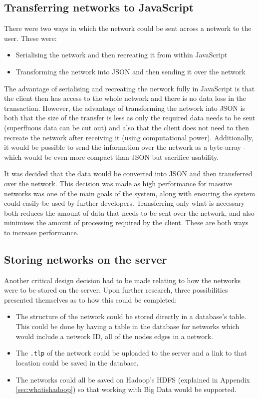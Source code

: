 \documentclass[../dissertation.tex]{subfiles}
\begin{document}
\subsection{Transferring networks to JavaScript}

There were two ways in which the network could be sent across a network to the user. These were:

\begin{itemize}
    \item Serialising the network and then recreating it from within JavaScript
    \item Transforming the network into JSON and then sending it over the network
\end{itemize}

The advantage of serialising and recreating the network fully in JavaScript is that the client then has access to the whole network and there is no data loss in the transaction. However, the advantage of transforming the network into JSON is both that the size of the transfer is less as only the required data needs to be sent (superfluous data can be cut out) and also that the client does not need to then recreate the network after receiving it (using computational power). Additionally, it would be possible to send the information over the network as a byte-array - which would be even more compact than JSON but sacrifice usability. 

It was decided that the data would be converted into JSON and then transferred over the network. This decision was made as high performance for massive networks was one of the main goals of the system, along with ensuring the system could easily be used by further developers. Transferring only what is necessary both reduces the amount of data that needs to be sent over the network, and also minimises the amount of processing required by the client. These are both ways to increase performance.

\subsection{Storing networks on the server}

Another critical design decision had to be made relating to how the networks were to be stored on the server. Upon further research, three possibilities presented themselves as to how this could be completed:

\begin{itemize}
    \item The structure of the network could be stored directly in a database's table. This could be done by having a table in the database for networks which would include a network ID, all of the nodes edges in a network.
    \item The \texttt{.tlp} of the network could be uploaded to the server and a link to that location could be saved in the database.
    \item The networks could all be saved on Hadoop's HDFS (explained in Appendix \ref{sec:whatishadoop}) so that working with Big Data would be supported.
\end{itemize}
\end{document}
